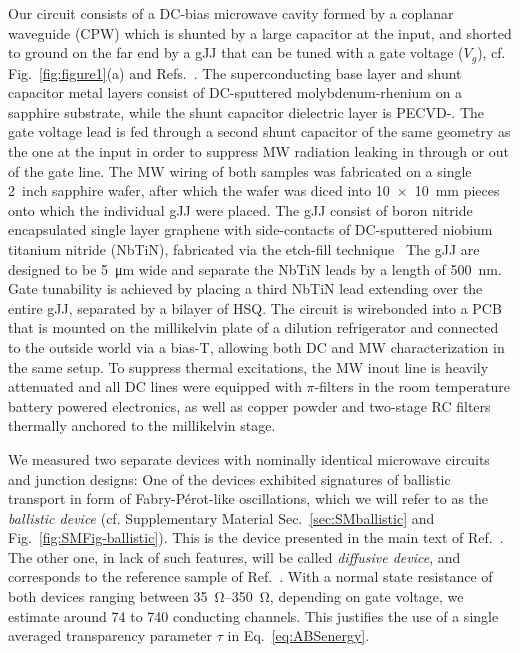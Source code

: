 Our circuit consists of a DC-bias microwave cavity formed by a coplanar waveguide (CPW) which is shunted by a large capacitor at the input, and shorted to ground on the far end by a gJJ that can be tuned with a gate voltage ($V_g$), cf. Fig.~\ref{fig:figure1}(a) and Refs.~\cite{schmidtBallisticGrapheneSuperconducting2018,schmidtCurrentDetectionUsing2020,bosmanBroadbandArchitectureGalvanically2015c}.
%
The superconducting base layer and shunt capacitor metal layers consist of DC-sputtered molybdenum-rhenium on a sapphire substrate, while the shunt capacitor dielectric layer is PECVD-.
%
The gate voltage lead is fed through a second shunt capacitor of the same geometry as the one at the input in order to suppress MW radiation leaking in through or out of the gate line.
%
The MW wiring of both samples was fabricated on a single \SI{2}{inch} sapphire wafer, after which the wafer was diced into \SI{10x10}{\milli\meter} pieces onto which the individual gJJ were placed.
%
The gJJ consist of boron nitride encapsulated single layer graphene with side-contacts of DC-sputtered niobium titanium nitride (NbTiN), fabricated via the etch-fill technique~\cite{wangOneDimensionalElectricalContact2013b,schmidtBallisticGrapheneSuperconducting2018}
%
The gJJ are designed to be \SI{5}{\micro\meter} wide and separate the NbTiN leads by a length of \SI{500}{\nano\meter}.
%
Gate tunability is achieved by placing a third NbTiN lead extending over the entire gJJ, separated by a bilayer of HSQ.
%
The circuit is wirebonded into a PCB that is mounted on the millikelvin plate of a dilution refrigerator and connected to the outside world via a bias-T, allowing both DC and MW characterization in the same setup.
%
To suppress thermal excitations, the MW inout line is heavily attenuated and all DC lines were equipped with $\pi$-filters in the room temperature battery powered electronics, as well as copper powder and two-stage RC filters thermally anchored to the millikelvin stage.

We measured two separate devices with nominally identical microwave circuits and junction designs:
%
One of the devices exhibited signatures of ballistic transport in form of Fabry-Pérot-like oscillations, which we will refer to as the \textit{ballistic device} (cf. Supplementary Material Sec.~\ref{sec:SMballistic} and Fig.~\ref{fig:SMFig-ballistic}).
%
This is the device presented in the main text of Ref.~\cite{schmidtBallisticGrapheneSuperconducting2018}.
%
The other one, in lack of such features, will be called \textit{diffusive device}, and corresponds to the reference sample of Ref.~\cite{schmidtBallisticGrapheneSuperconducting2018}.
%
With a normal state resistance of both devices ranging between \SIrange{35}{350}{\ohm}, depending on gate voltage, we estimate around 74 to 740 conducting channels.
%
This justifies the use of a single averaged transparency parameter $\tau$ in Eq.~\ref{eq:ABSenergy}.

